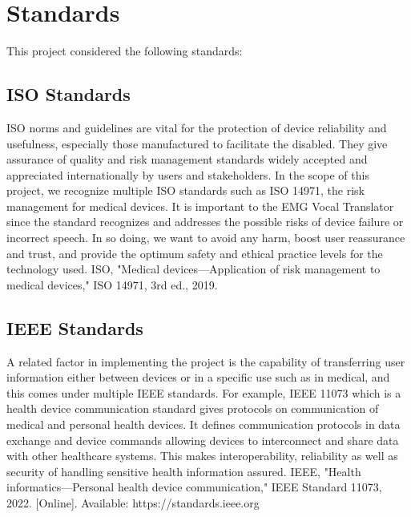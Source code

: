 \section{Standards}
This project considered the following standards:

\subsection{ISO Standards}
ISO norms and guidelines are vital for the protection of device reliability and usefulness, especially those manufactured to facilitate the disabled. They give assurance of quality and risk management standards widely accepted and appreciated internationally by users and stakeholders. In the scope of this project, we recognize multiple ISO standards such as ISO 14971, the risk management for medical devices. It is important to the EMG Vocal Translator since the standard recognizes and addresses the possible risks of device failure or incorrect speech. In so doing, we want to avoid any harm, boost user reassurance and trust, and provide the optimum safety and ethical practice levels for the technology used.
ISO, "Medical devices—Application of risk management to medical devices," ISO 14971, 3rd ed., 2019.

\subsection{IEEE Standards}
A related factor in implementing the project is the capability of transferring user information either between devices or in a specific use such as in medical, and this comes under multiple IEEE standards. For example, IEEE 11073 which is a health device communication standard gives protocols on communication of medical and personal health devices. It defines communication protocols in data exchange and device commands allowing devices to interconnect and share data with other healthcare systems. This makes interoperability, reliability as well as security of handling sensitive health information assured.
IEEE, "Health informatics—Personal health device communication," IEEE Standard 11073, 2022. [Online]. Available: https://standards.ieee.org
